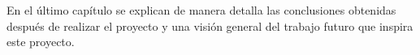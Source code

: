 En el \'ultimo cap\'itulo se explican de manera detalla las conclusiones obtenidas despu\'es de realizar el proyecto y una visi\'on general del trabajo futuro que inspira este proyecto.





